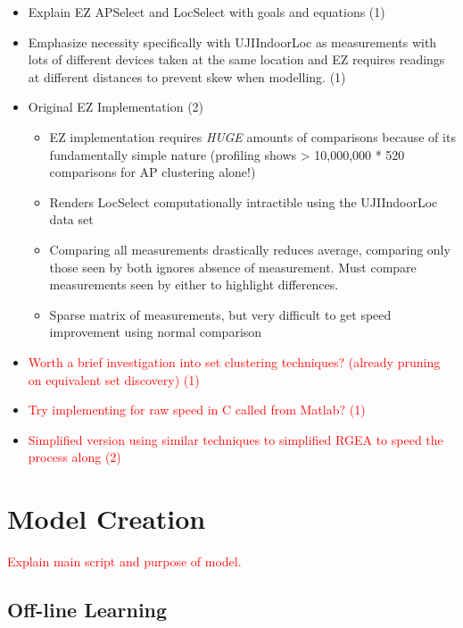 \documentclass{UoYCSproject}
\begin{document}
			\begin{itemize}
                \item Explain EZ APSelect and LocSelect with goals and equations (1)
				\item Emphasize necessity specifically with UJIIndoorLoc as measurements with lots of different devices taken at the same location and EZ requires readings at different distances to prevent skew when modelling. (1)
                \item Original EZ Implementation (2)
                \begin{itemize}
                    \item EZ implementation requires \emph{HUGE} amounts of comparisons because of its fundamentally simple nature (profiling shows > 10,000,000 * 520 comparisons for AP clustering alone!)
                    \item Renders LocSelect computationally intractible using the UJIIndoorLoc data set
                    \item Comparing all measurements drastically reduces average, comparing only those seen by both ignores absence of measurement. Must compare measurements seen by either to highlight differences.
                    \item Sparse matrix of measurements, but very difficult to get speed improvement using normal comparison
                \end{itemize}
				\item \textcolor{red}{Worth a brief investigation into set clustering techniques? (already pruning on equivalent set discovery) (1)}
                \item \textcolor{red}{Try implementing for raw speed in C called from Matlab? (1)}
				\item \textcolor{red}{Simplified version using similar techniques to simplified RGEA to speed the process along (2)}
			\end{itemize}
		
		\section{Model Creation}
        \label{sec:modelcreation}
        
            \textcolor{red}{Explain main script and purpose of model.}
        
            \subsection{Off-line Learning}
            
\end{document}
